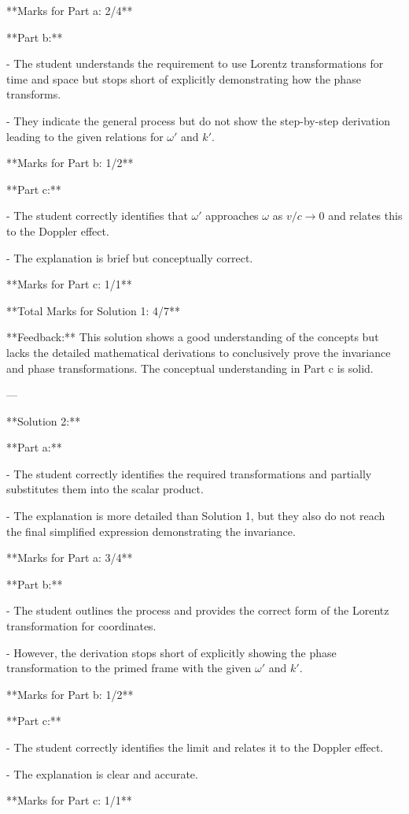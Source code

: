 \documentclass[a4paper,11pt]{article}
\begin{document}
**Marks for Part a: 2/4**

**Part b:**

- The student understands the requirement to use Lorentz transformations for time and space but stops short of explicitly demonstrating how the phase transforms.

- They indicate the general process but do not show the step-by-step derivation leading to the given relations for \(\omega'\) and \(k'\).

**Marks for Part b: 1/2**

**Part c:**

- The student correctly identifies that \(\omega'\) approaches \(\omega\) as \(v/c \rightarrow 0\) and relates this to the Doppler effect.

- The explanation is brief but conceptually correct.

**Marks for Part c: 1/1**

**Total Marks for Solution 1: 4/7**

**Feedback:** This solution shows a good understanding of the concepts but lacks the detailed mathematical derivations to conclusively prove the invariance and phase transformations. The conceptual understanding in Part c is solid.

---

**Solution 2:**

**Part a:**

- The student correctly identifies the required transformations and partially substitutes them into the scalar product.

- The explanation is more detailed than Solution 1, but they also do not reach the final simplified expression demonstrating the invariance.

**Marks for Part a: 3/4**

**Part b:**

- The student outlines the process and provides the correct form of the Lorentz transformation for coordinates.

- However, the derivation stops short of explicitly showing the phase transformation to the primed frame with the given \(\omega'\) and \(k'\).

**Marks for Part b: 1/2**

**Part c:**

- The student correctly identifies the limit and relates it to the Doppler effect.

- The explanation is clear and accurate.

**Marks for Part c: 1/1**
\end{document}
